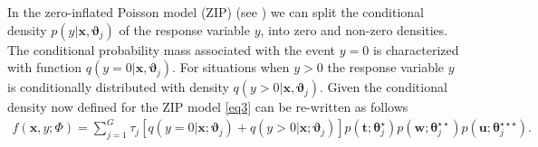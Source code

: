 \documentclass[11pt,letterpaper]{article}
\numberwithin{equation}{section}
\numberwithin{equation}{section}
\numberwithin{equation}{section}
\begin{document}
In the zero-inflated Poisson model (ZIP) (see \cite{Lambert}) we can split the conditional density $p(y|\bm{x},\bm{\vartheta}_j)$ of the response variable $y$, into zero and non-zero densities. %
The conditional probability mass associated with the event $y=0$ is characterized with function $q(y = 0|\bm{x},\bm{\vartheta}_{j})$. For situations when $y > 0$ the response variable $y$ is conditionally distributed with density $q(y > 0|\bm{x}, \bm{\vartheta}_{j} )$. Given the conditional density now defined for the ZIP model \eqref{eq3}
can be re-written as follows
 \begin{align}
 f(\bm x, y; \Phi)= \sum_{j=1}^{G} \tau_j \left[ q(y = 0|\bm{x};\bm{\vartheta}_{j} ) +  q(y > 0|\bm{x} ; \bm{\vartheta}_{j}  ) \right]   p(\bm{t};\bm{\theta}_j^{\star})p(\bm{w};\bm{\theta}_j^{\star\star})p(\bm{u};\bm{\theta}_j^{\star\star\star}).
\end{align}
\end{document}
